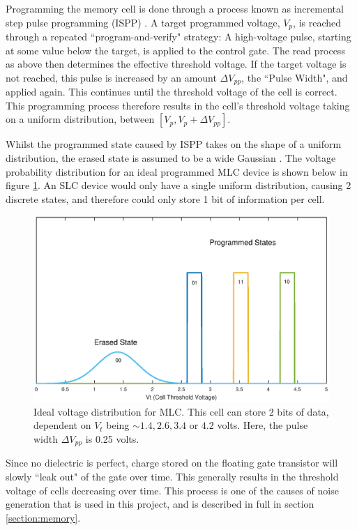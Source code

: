 \documentclass[11pt]{article}
\numberwithin{equation}{subsection}
\begin{document}
Programming the memory cell is done through a process known as incremental step pulse programming (ISPP) \cite{dong2012estimating}. A target programmed voltage, $V_p$, is reached through a repeated ``program-and-verify" strategy: A high-voltage pulse, starting at some value below the target, is applied to the control gate. The read process as above then determines the effective threshold voltage. If the target voltage is not reached, this pulse is increased by an amount $\Delta V_{pp}$, the ``Pulse Width", and applied again. This continues until the threshold voltage of the cell is correct. This programming process therefore results in the cell's threshold voltage taking on a uniform distribution, between $[V_p, V_p + \Delta V_{pp}]$. 

Whilst the programmed state caused by ISPP takes on the shape of a uniform distribution, the erased state is assumed to be a wide Gaussian \cite{dong2012estimating}. The voltage probability distribution for an ideal programmed MLC device is shown below in figure \ref{figure:mlc_distribution}. An SLC device would only have a single uniform distribution, causing 2 discrete states, and therefore could only store 1 bit of information per cell.

\begin{figure}[h]
\centering
\includegraphics[scale=0.75]{memory_voltage_mlc}
\caption[]{Ideal voltage distribution for MLC. This cell can store 2 bits of data, dependent on $V_t$ being $\sim 1.4, 2.6, 3.4$ or $4.2$ volts. Here, the pulse width $\Delta V_{pp}$ is 0.25 volts.}
\label{figure:mlc_distribution}
\end{figure}

Since no dielectric is perfect, charge stored on the floating gate transistor will slowly ``leak out" of the gate over time. This generally results in the threshold voltage of cells decreasing over time. This process is one of the causes of noise generation that is used in this project, and is described in full in section \ref{section:memory}.
\end{document}
